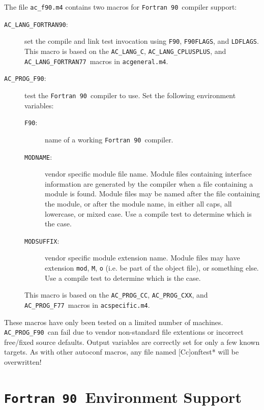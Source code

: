 \documentclass[11pt]{nmemo}
\newcommand{\fninety}{\texttt{Fortran~90}}
\newcommand{\langfninety}{\texttt{AC\_LANG\_FORTRAN90}}
\newcommand{\progfninety}{\texttt{AC\_PROG\_F90}}
\newcommand{\langc}{\texttt{AC\_LANG\_C}}
\newcommand{\langcplusplus}{\texttt{AC\_LANG\_CPLUSPLUS}}
\newcommand{\langfseventyseven}{\texttt{AC\_LANG\_FORTRAN77}}
\newcommand{\progcc}{\texttt{AC\_PROG\_CC}}
\newcommand{\progcxx}{\texttt{AC\_PROG\_CXX}}
\newcommand{\progfseventyseven}{\texttt{AC\_PROG\_F77}}
\begin{document}
The file \texttt{ac\_f90.m4} contains two macros for \fninety\
compiler support:
\begin{description}
\item[\langfninety:] set the compile and link test invocation using
\texttt{F90}, \texttt{F90FLAGS}, and \texttt{LDFLAGS}.  This macro is
based on the \langc, \langcplusplus, and \langfseventyseven\ macros in
\texttt{acgeneral.m4}.
\item[\progfninety:] test the \fninety\ compiler to use.  Set the
following environment variables:
\begin{description}
\item[\texttt{F90}:] name of a working \fninety\ compiler.
\item[\texttt{MODNAME}:] vendor specific module file name.  Module
files containing interface information are generated by the compiler
when a file containing a module is found.  Module files may be named
after the file containing the module, or after the module name, in
either all caps, all lowercase, or mixed case.  Use a compile test to
determine which is the case.   
\item[\texttt{MODSUFFIX}:] vendor specific module extension name.
Module files may have extension \texttt{mod}, \texttt{M}, \texttt{o}
(i.e. be part of the object file), or something else.  Use a compile
test to determine which is the case.
\end{description}
This macro is based on the \progcc, \progcxx, and \progfseventyseven\
macros in \texttt{acspecific.m4}.
\end{description}

These macros have only been tested on a limited number of machines.
\progfninety\ can fail due to vendor non-standard file extentions or
incorrect free/fixed source defaults.  Output variables are correctly
set for only a few known targets.  As with other autoconf macros, any
file named [Cc]onftest* will be overwritten!

\section{\fninety\ Environment Support}
\end{document}
